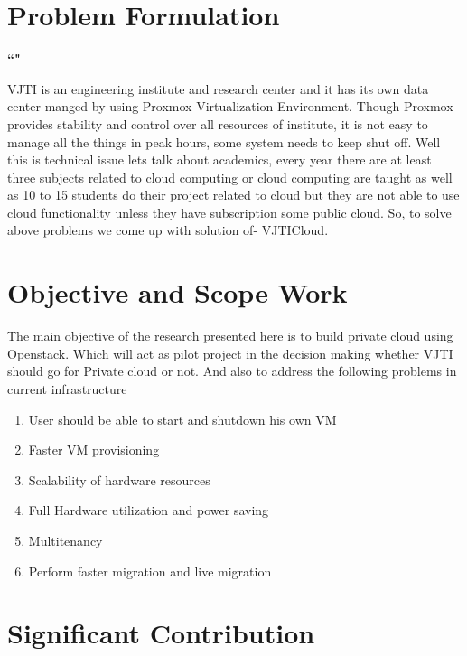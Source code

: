 \section{Problem Formulation}
 \par
 \textbf{\textquotedblleft \@title"}
 
 \par VJTI is an engineering institute and research center and it has its own data center manged by using Proxmox Virtualization Environment. Though Proxmox provides stability and control over all resources of institute, it is not easy to manage all the things in peak hours, some system needs to keep shut off. Well this is technical issue lets talk about academics, every year there are at least three subjects related to cloud computing or cloud computing are taught as well as 10 to 15 students do their project related to cloud but they are not able to use cloud functionality unless they have subscription some public cloud. So, to solve above problems we come up with solution of- VJTICloud.

\section{Objective and Scope Work}

The main objective of the research presented here is to build private cloud using Openstack. Which will act as pilot project in the decision making whether VJTI should go for Private cloud or not. And also to address the following problems in current infrastructure 

\begin{enumerate}
  \item User should be able to start and shutdown his own VM
  \item Faster VM provisioning
  \item Scalability of hardware resources
  \item Full Hardware utilization and power saving %
  \item Multitenancy %
  \item Perform faster migration and live migration %
\end{enumerate}


\section{Significant Contribution}

